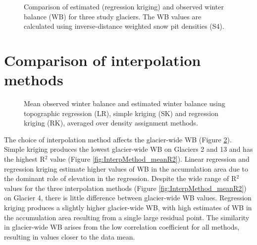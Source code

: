 \documentclass{sfuthesis}
\begin{document}
\begin{figure}[H]
	\caption{Comparison of estimated (regression kriging) and observed winter balance (WB) for three study glaciers. The WB values are calculated using inverse-distance weighted snow pit densities (S4).}
	\label{fig:R2regressionkrig}
\end{figure}


\section{Comparison of interpolation methods}
\label{sec:compareInterpMethods}

\begin{figure}[H][b]
	\caption{Mean observed winter balance and estimated winter balance using topographic regression (LR), simple kriging (SK) and regression kriging (RK), averaged over density assignment methods.}
	\label{fig:InterpMethod_mean}
\end{figure}


The choice of interpolation method affects the glacier-wide WB (Figure \ref{fig:InterpMethod_mean}). Simple kriging produces the lowest glacier-wide WB on Glaciers 2 and 13 and has the highest R$^2$ value (Figure \ref{fig:InterpMethod_meanR2}). Linear regression and regression kriging estimate higher values of WB in the accumulation area due to the dominant role of elevation in the regression. Despite the wide range of R$^2$ values for the three interpolation methods (Figure \ref{fig:InterpMethod_meanR2}) on Glacier 4, there is little difference between glacier-wide WB values. Regression kriging produces a slightly higher glacier-wide WB, with high estimates of WB in the accumulation area resulting from a single large residual point. The similarity in glacier-wide WB arises from the low correlation coefficient for all methods, resulting in values closer to the data mean. 
\end{document}
